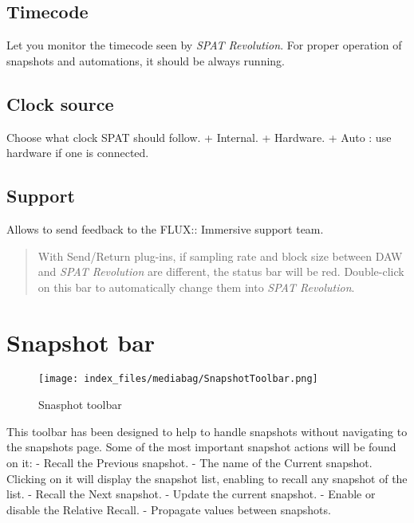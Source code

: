 \documentclass[
  letterpaper,
  DIV=11,
  numbers=noendperiod]{scrreport}
\begin{document}
\hypertarget{timecode}{%
\subsection{Timecode}\label{timecode}}

Let you monitor the timecode seen by \emph{SPAT Revolution}. For proper
operation of snapshots and automations, it should be always running.

\hypertarget{clock-source}{%
\subsection{Clock source}\label{clock-source}}

Choose what clock SPAT should follow. + Internal. + Hardware. + Auto :
use hardware if one is connected.

\hypertarget{support}{%
\subsection{Support}\label{support}}

Allows to send feedback to the FLUX:: Immersive support team.

\begin{quote}
With Send/Return plug-ins, if sampling rate and block size between DAW
and \emph{SPAT Revolution} are different, the status bar will be red.
Double-click on this bar to automatically change them into \emph{SPAT
Revolution}.
\end{quote}

\hypertarget{snapshot-bar}{%
\section{Snapshot bar}\label{snapshot-bar}}

\begin{figure}

{\centering \texttt{[image: index\_files/mediabag/SnapshotToolbar.png]}

}

\caption{Snasphot toolbar}

\end{figure}

This toolbar has been designed to help to handle snapshots without
navigating to the snapshots page. Some of the most important snapshot
actions will be found on it: - Recall the Previous snapshot. - The name
of the Current snapshot. Clicking on it will display the snapshot list,
enabling to recall any snapshot of the list. - Recall the Next snapshot.
- Update the current snapshot. - Enable or disable the Relative Recall.
- Propagate values between snapshots.
\end{document}
